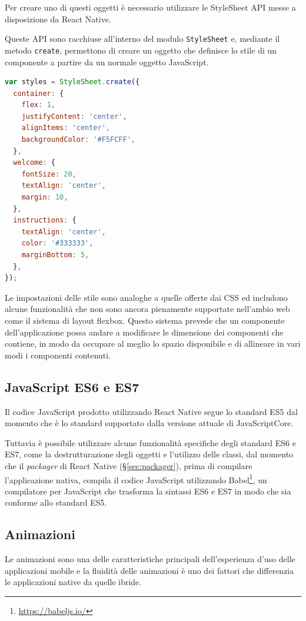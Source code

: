 Per creare uno di questi oggetti è necessario utilizzare le StyleSheet API messe a disposizione da React Native.

Queste API sono racchiuse all'interno del modulo \texttt{StyleSheet} e, mediante il metodo \texttt{create}, permettono di creare un oggetto che definisce lo stile di un componente a partire da un normale oggetto JavaScript.

\begin{lstlisting}[language=JavaScript, caption=Esempio della definizione dello stile di un componente di React Native]
var styles = StyleSheet.create({
  container: {
    flex: 1,
    justifyContent: 'center',
    alignItems: 'center',
    backgroundColor: '#F5FCFF',
  },
  welcome: {
    fontSize: 20,
    textAlign: 'center',
    margin: 10,
  },
  instructions: {
    textAlign: 'center',
    color: '#333333',
    marginBottom: 5,
  },
});
\end{lstlisting}

Le impostazioni delle stile sono analoghe a quelle offerte dai CSS ed includono alcune funzionalità che non sono ancora pienamente supportate nell'ambio web come il sistema di layout flexbox.
Questo sistema prevede che un componente dell'applicazione possa andare a modificare le dimensione dei componenti che contiene, in modo da occupare al meglio lo spazio disponibile e di allineare in vari modi i componenti contenuti.

\subsection{JavaScript ES6 e ES7}

Il codice JavaScript prodotto utilizzando React Native segue lo standard ES5 dal momento che è lo standard supportato dalla versione attuale di JavaScriptCore.

Tuttavia è possibile utilizzare alcune funzionalità specifiche degli standard ES6 e ES7, come la destrutturazione degli oggetti e l'utilizzo delle classi, dal momento che il \textit{packager} di React Native (§\ref{sec:packager}), prima di compilare l'applicazione nativa, compila il codice JavaScript utilizzando Babel\footnote{\url{https://babeljs.io/}}, un compilatore per JavaScript che trasforma la sintassi ES6 e ES7 in modo che sia conforme allo standard ES5.

\subsection{Animazioni}
Le animazioni sono una delle caratteristiche principali dell'esperienza d'uso delle applicazioni mobile e la fluidità delle animazioni è uno dei fattori che differenzia le applicazioni native da quelle ibride.

